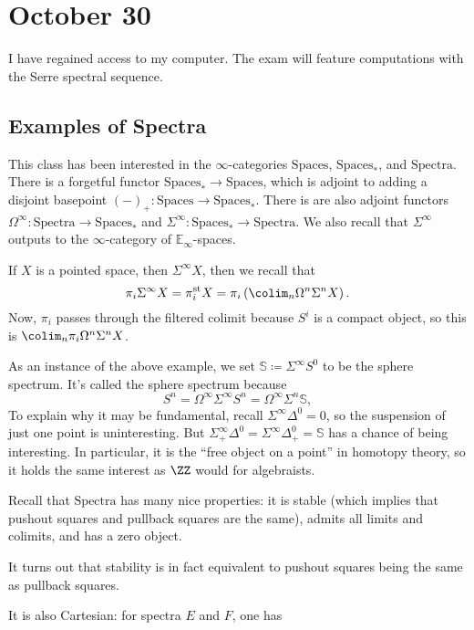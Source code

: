 \documentclass[../notes.tex]{subfiles}
\begin{document}
\section{October 30}
I have regained access to my computer. The exam will feature computations with the Serre spectral sequence.

\subsection{Examples of Spectra}
This class has been interested in the $\infty$-categories $\mathrm{Spaces}$, $\mathrm{Spaces}_*$, and $\mathrm{Spectra}$. There is a forgetful functor $\mathrm{Spaces}_*\to\mathrm{Spaces}$, which is adjoint to adding a disjoint basepoint $(-)_+\colon\mathrm{Spaces}\to\mathrm{Spaces}_*$. There is are also adjoint functors $\Omega^\infty\colon\mathrm{Spectra}\to\mathrm{Spaces}_*$ and $\Sigma^\infty\colon\mathrm{Spaces}_*\to\mathrm{Spectra}$. We also recall that $\Sigma^\infty$ outputs to the $\infty$-category of $\mathbb E_\infty$-spaces.
\begin{example}
	If $X$ is a pointed space, then $\Sigma^\infty X$, then we recall that
	\[\pi_i\Sigma^\infty X=\pi_i^{\mathrm{st}}X=\pi_i\left(\colim_n\Omega^n\Sigma^n X\right).\]
	Now, $\pi_i$ passes through the filtered colimit because $S^i$ is a compact object, so this is $\colim_n\pi_i\Omega^n\Sigma^nX$.
\end{example}
\begin{example}
	As an instance of the above example, we set $\mathbb S\coloneqq\Sigma^\infty S^0$ to be the sphere spectrum. It's called the sphere spectrum because
	\[S^n=\Omega^\infty\Sigma^\infty S^n=\Omega^\infty\Sigma^n\mathbb S,\]
	To explain why it may be fundamental, recall $\Sigma^\infty\Delta^0=0$, so the suspension of just one point is uninteresting. But $\Sigma^\infty_+\Delta^0=\Sigma^\infty\Delta^0_+=\mathbb S$ has a chance of being interesting. In particular, it is the ``free object on a point'' in homotopy theory, so it holds the same interest as $\ZZ$ would for algebraists.
\end{example}
Recall that $\mathrm{Spectra}$ has many nice properties: it is stable (which implies that pushout squares and pullback squares are the same), admits all limits and colimits, and has a zero object.
\begin{remark}
	It turns out that stability is in fact equivalent to pushout squares being the same as pullback squares.
\end{remark}
It is also Cartesian: for spectra $E$ and $F$, one has
\end{document}
